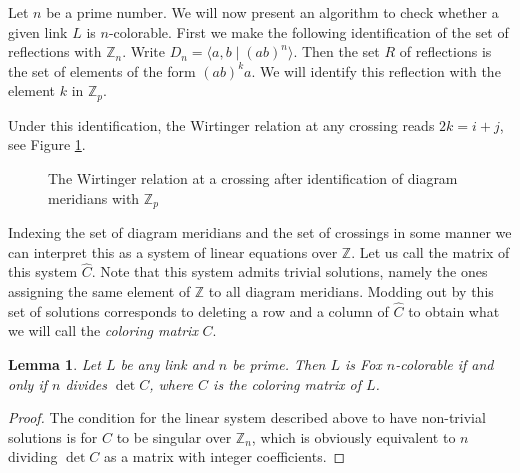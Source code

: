 \documentclass{article}
\newtheorem{lemma}[theorem]{Lemma}
\theoremstyle{definition}
\begin{document}
Let $n$ be a prime number. We will now present an algorithm to check whether a given link $L$ is $n$-colorable. First we make the following identification of the set of reflections with $\mathbb{Z}_n$. Write $D_n = \langle a, b \; | \; (ab)^n \rangle$. Then the set $R$ of reflections is the set of elements of the form $(ab)^ka$. We will identify this reflection with the element $k$ in $\mathbb{Z}_p$.

Under this identification, the Wirtinger relation at any crossing reads $2k = i + j$, see Figure \ref{fig:wirtinger-dihedral}.

\begin{figure}[ht]
\centering
{}
\caption{The Wirtinger relation at a crossing after identification of diagram meridians with $\mathbb{Z}_p$}
\label{fig:wirtinger-dihedral}
\end{figure}

Indexing the set of diagram meridians and the set of crossings in some manner we can interpret this as a system of linear equations over $\mathbb{Z}$. Let us call the matrix of this system $\widehat{C}$. Note that this system admits trivial solutions, namely the ones assigning the same element of $\mathbb{Z}$ to all diagram meridians. Modding out by this set of solutions corresponds to deleting a row and a column of $\widehat{C}$ to obtain what we will call the \textit{coloring matrix} $C$.

\begin{lemma}
Let $L$ be any link and $n$ be prime. Then $L$ is Fox $n$-colorable if and only if $n$ divides $\det C$, where $C$ is the coloring matrix of $L$.
\end{lemma}

\begin{proof}
The condition for the linear system described above to have non-trivial solutions is for $C$ to be singular over $\mathbb{Z}_n$, which is obviously equivalent to $n$ dividing $\det C$ as a matrix with integer coefficients.
\end{proof}
\end{document}
